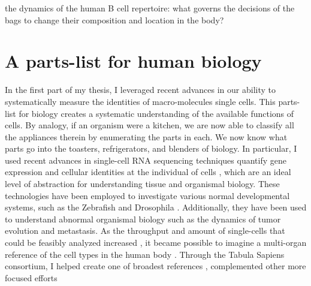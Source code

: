 the dynamics of the human B cell repertoire: what governs the decisions of the bags to change their composition and location in the body?     

\section{A parts-list for human biology} 
In the first part of my thesis, I leveraged recent advances in our ability to systematically measure the identities of macro-molecules single cells. This parts-list for biology creates a systematic understanding of the available functions of cells. By analogy, if an organism were a kitchen, we are now able to classify all the appliances therein by enumerating the parts in each. We now know what parts go into the toasters, refrigerators, and blenders of biology. In particular, I used recent advances in single-cell RNA sequencing techniques quantify gene expression and cellular identities at the individual of cells \cite{klein_droplet_2015, macosko2015highly}, which are an ideal level of abstraction for understanding tissue and organismal biology. These technologies have been employed to investigate various normal developmental systems, such as the Zebrafish and Drosophila \cite{wagner_single-cell_2018,ingle2015drosophila}. Additionally, they have been used to understand abnormal organismal biology such as the dynamics of tumor evolution and metastasis\cite{pierson2017single}. As the throughput and amount of single-cells that could be feasibly analyzed increased \cite{linnarsson2016single}, it became possible to imagine a multi-organ reference of the cell types in the human body \cite{regev2017human}. Through the Tabula Sapiens consortium, I helped create one of broadest references \cite{tabula_sapiens_consortium_tabula_2022}, complemented other more focused efforts \cite{dominguez_conde_cross-tissue_2022}

